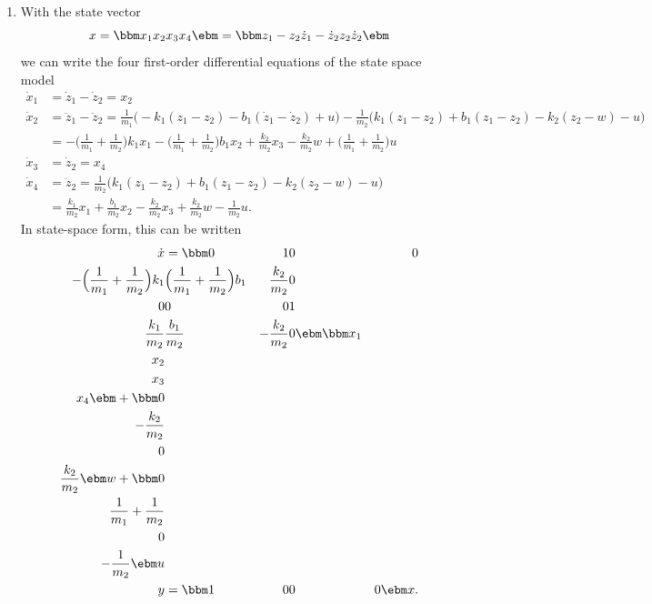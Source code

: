 \documentclass{scrartcl}
\begin{document}
\begin{enumerate}
\item With the state vector 
\[ x = \bbm x_1\\x_2\\x_3\\x_4 \ebm = \bbm z_1 - z_2\\ \dot{z}_1 - \dot{z}_2 \\ z_2\\ \dot{z}_2 \ebm \]
we can write the four first-order differential equations of the state space model
 \begin{align*}
  \dot{x}_1 &= \dot{z}_1 - \dot{z}_2 = x_2\\
  \dot{x}_2 &= \ddot{z}_1 - \ddot{z}_2 = \frac{1}{m_1}\big( -k_1(z_1 - z_2) - b_1(\dot{z}_1 - \dot{z}_2) + u \Big) - \frac{1}{m_2} \Big(k_1(z_1 - z_2) + b_1(z_1 - z_2) - k_2(z_2-w) - u\Big)  \\
            &= -\Big(\frac{1}{m_1} + \frac{1}{m_2}\Big)k_1x_1 - \Big(\frac{1}{m_1} + \frac{1}{m_2}\Big)b_1x_2 + \frac{k_2}{m_2}x_3 - \frac{k_2}{m_2}w + \Big(\frac{1}{m_1} + \frac{1}{m_2}\Big) u\\
  \dot{x}_3 &= \dot{z}_2 = x_4\\
  \dot{x}_4 &= \ddot{z}_2 = \frac{1}{m_2} \Big( k_1(z_1 - z_2) + b_1(z_1 - z_2) - k_2(z_2-w) - u \Big)\\
            &= \frac{k_1}{m_2} x_1 + \frac{b_1}{m_2} x_2 - \frac{k_2}{m_2}x_3 + \frac{k_2}{m_2}w - \frac{1}{m_2}u.
\end{align*}
In state-space form, this can be written
\begin{align*}
\dot{x} &= \bbm 0 & 1 & 0 & 0\\ 
               -\Big(\frac{1}{m_1} + \frac{1}{m_2}\Big)k_1 & \Big(\frac{1}{m_1} + \frac{1}{m_2}\Big)b_1 & \frac{k_2}{m_2} & 0\\
               0 & 0 & 0 & 1\\
               \frac{k_1}{m_2} & \frac{b_1}{m_2} & - \frac{k_2}{m_2} & 0\ebm
               \bbm x_1\\x_2\\x_3\\x_4 \ebm + \bbm 0\\-\frac{k_2}{m_2}\\0\\\frac{k_2}{m_2} \ebm w + \bbm 0\\\frac{1}{m_1} + \frac{1}{m_2}\\0\\-\frac{1}{m_2} \ebm u \\
 y &= \bbm 1 & 0 & 0 & 0 \ebm x.
\end{align*}
\end{enumerate}
\end{document}
